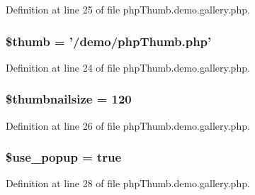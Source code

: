 \-Definition at line 25 of file php\-Thumb.\-demo.\-gallery.\-php.

\hypertarget{php_thumb_8demo_8gallery_8php_a49f22ef470a5fd63b3e4c5dd98f42ca5}{
\subsubsection[{\$thumb}]{\setlength{\rightskip}{0pt plus 5cm}\$thumb = '/demo/php\-Thumb.\-php'}}\label{php_thumb_8demo_8gallery_8php_a49f22ef470a5fd63b3e4c5dd98f42ca5}


\-Definition at line 24 of file php\-Thumb.\-demo.\-gallery.\-php.

\hypertarget{php_thumb_8demo_8gallery_8php_aac5bfce0be309364b2e712c47989e106}{
\subsubsection[{\$thumbnailsize}]{\setlength{\rightskip}{0pt plus 5cm}\$thumbnailsize = 120}}\label{php_thumb_8demo_8gallery_8php_aac5bfce0be309364b2e712c47989e106}


\-Definition at line 26 of file php\-Thumb.\-demo.\-gallery.\-php.

\hypertarget{php_thumb_8demo_8gallery_8php_adb6effb867173540d2cd3cfc84ec740e}{
\subsubsection[{\$use\-\_\-popup}]{\setlength{\rightskip}{0pt plus 5cm}\$use\-\_\-popup = true}}\label{php_thumb_8demo_8gallery_8php_adb6effb867173540d2cd3cfc84ec740e}


\-Definition at line 28 of file php\-Thumb.\-demo.\-gallery.\-php.

